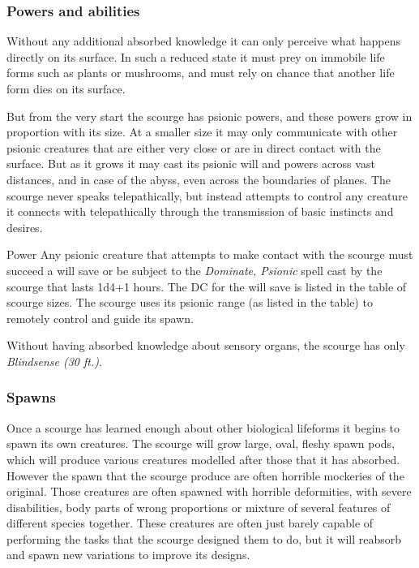 \subsubsection{Powers and abilities}

Without any additional absorbed knowledge it can only perceive what happens
directly on its surface. In such a reduced state it must prey on immobile life
forms such as plants or mushrooms, and must rely on chance that another life
form dies on its surface.

But from the very start the scourge has psionic powers, and these powers grow
in proportion with its size. At a smaller size it may only communicate with
other psionic creatures that are either very close or are in direct contact
with the surface. But as it grows it may cast its psionic will and powers
across vast distances, and in case of the abyss, even across the boundaries of
planes. The scourge never speaks telepathically, but instead attempts to
control any creature it connects with telepathically through the transmission
of basic instincts and desires.

\begin{35e}{Power}
  Any psionic creature that attempts to make contact with the scourge must
  succeed a will save or be subject to the \emph{Dominate, Psionic} spell
  cast by the scourge that lasts 1d4+1 hours. The DC for the will save is
  listed in the table of scourge sizes. The scourge uses its psionic range (as
  listed in the table) to remotely control and guide its spawn.

  Without having absorbed knowledge about sensory organs, the scourge has
  only \emph{Blindsense (30 ft.)}.
\end{35e}

\subsubsection{Spawns}
\label{sec:Spawns}

Once a scourge has learned enough about other biological lifeforms it begins
to spawn its own creatures. The scourge will grow large, oval, fleshy spawn
pods, which will produce various creatures modelled after those that it has
absorbed. However the spawn that the scourge produce are often horrible
mockeries of the original. Those creatures are often spawned with horrible
deformities, with severe disabilities, body parts of wrong proportions or
mixture of several features of different species together. These creatures are
often just barely capable of performing the tasks that the scourge designed
them to do, but it will reabsorb and spawn new variations to improve its
designs.

